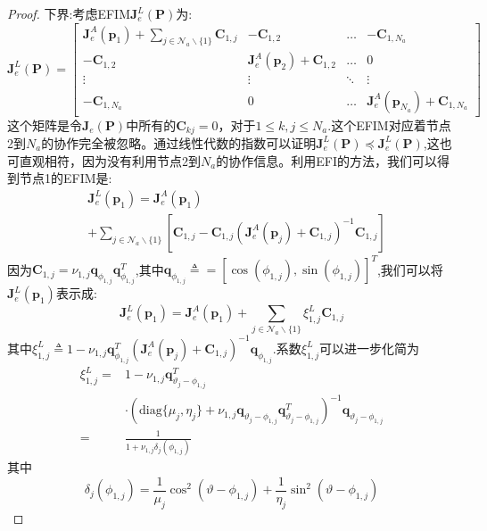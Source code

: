 \begin{proof}
下界:考虑EFIM$\bm{J}_e^L(\bm{P})$为:
\begin{equation}
\bm{J}_e^L(\bm{P})=\left[
\begin{array}{cccc}
\bm{J}_e^A(\bm{p}_1)+\sum_{j\in \mathcal{N}_a\backslash \{1\}}\bm{C}_{1,j}&-\bm{C}_{1,2}& \dots & -\bm{C}_{1,N_a}\\
-\bm{C}_{1,2} &\bm{J}_e^A(\bm{p}_2)+\bm{C}_{1,2} & \dots & 0\\
\vdots & \vdots & \ddots & \vdots\\
-\bm{C}_{1,N_a} & 0 & \dots & \bm{J}_e^A(\bm{p}_{N_a})+\bm{C}_{1,N_a}
\end{array}
\right]
\end{equation}
这个矩阵是令$\bm{J}_e(\bm{P})$中所有的$\bm{C}_{kj}=0$，对于$1\le k,j \leq N_a$.这个EFIM对应着节点2到$N_a$的协作完全被忽略。通过线性代数的指数可以证明$\bm{J}_e^L(\bm{P})\preceq \bm{J}_e^L(\bm{P})$,这也可直观相符，因为没有利用节点2到$N_a$的协作信息。利用EFI的方法，我们可以得到节点1的EFIM是:
\begin{equation*}
\begin{split}
&\bm{J}_e^L(\bm{p}_1)=\bm{J}_e^A(\bm{p}_1)\\
&+\sum_{j\in \mathcal{N}_a \backslash \{1\}}[\bm{C}_{1,j}-\bm{C}_{1,j}(\bm{J}_e^A(\bm{p}_j)+\bm{C}_{1,j})^{-1}\bm{C}_{1,j}]
\end{split}
\end{equation*}
因为$\bm{C}_{1,j}=\nu_{1,j}\bm{q}_{\phi_{1,j}}\bm{q}_{\phi_{1,j}}^T$,其中$\bm{q}_{\phi_{1,j}}\triangleq=[\cos(\phi_{1,j}),\sin(\phi_{1,j})]^T$,我们可以将$\bm{J}^L_e(\bm{p}_1)$表示成:
\begin{equation}
\bm{J}_e^L(\bm{p}_1)=\bm{J}_e^A(\bm{p}_1)
+\sum_{j\in \mathcal{N}_a \backslash \{1\}}\xi_{1,j}^L\bm{C}_{1,j}
\end{equation}
其中$\xi_{1,j}^L\triangleq 1-\nu_{1,j}\bm{q}^T_{\phi_{1,j}}(\bm{J}^A_e(\bm{p}_j)+\bm{C}_{1,j})^{-1}\bm{q}_{\phi_{1,j}}$.系数$\xi_{1,j}^L$可以进一步化简为
\begin{equation}
\begin{split}
\xi_{1,j}^L=&1-\nu_{1,j}\bm{q}^T_{\vartheta_j-\phi_{1,j}}\\
&\cdot (\text{diag}\{\mu_j,\eta_j\}+\nu_{1,j}\bm{q}_{\vartheta_j-\phi_{1,j}}\bm{q}^T_{\vartheta_j-\phi_{1,j}})^{-1}\bm{q}_{\vartheta_j-\phi_{1,j}}\\
=&\frac{1}{1+\nu_{1,j}\delta_j(\phi_{1,j})}
\end{split}
\end{equation}
其中
$$\delta_j(\phi_{1,j})=\frac{1}{\mu_j}\cos^2(\vartheta-\phi_{1,j})+\frac{1}{\eta_j}\sin^2(\vartheta-\phi_{1,j})$$


\end{proof}
